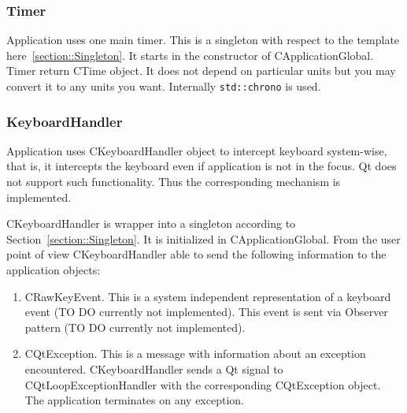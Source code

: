 \documentclass{article}
\begin{document}
\subsubsection{Timer}

Application uses one main timer. This is a singleton with respect to the template here~\ref{section::Singleton}. It starts in the constructor of CApplicationGlobal. Timer return CTime object. It does not depend on particular units but you may convert it to any units you want. Internally \verb"std::chrono" is used.

\subsubsection{KeyboardHandler}

Application uses CKeyboardHandler object to intercept keyboard system-wise, that is, it intercepts the keyboard even if application is not in the focus. Qt does not support such functionality. Thus the corresponding mechanism is implemented.

CKeyboardHandler is wrapper into a singleton according to Section~\ref{section::Singleton}. It is initialized in CApplicationGlobal. From the user point of view CKeyboardHandler able to send the following information to the application objects:
\begin{enumerate}
\item CRawKeyEvent. This is a system independent representation of a keyboard event (TO DO currently not implemented). This event is sent via Observer pattern (TO DO currently not implemented).

\item CQtException. This is a message with information about an exception encountered. CKeyboardHandler sends a Qt signal to CQtLoopExceptionHandler with the corresponding CQtException object. The application terminates on any exception.
\end{enumerate}
\end{document}
